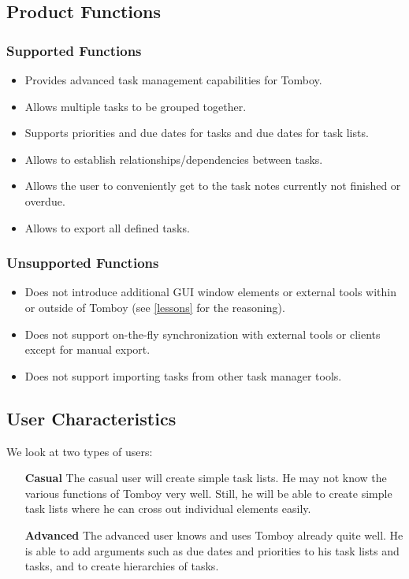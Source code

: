 \subsection{Product Functions}
\label{description:functions}

  \subsubsection*{Supported Functions}
  \label{description:functions:supported}

    \begin{itemize}
      \item Provides advanced task management capabilities for Tomboy.
      \item Allows multiple tasks to be grouped together.
      \item Supports priorities and due dates for tasks and due dates for task lists.
      \item Allows to establish relationships/dependencies between tasks.
      \item Allows the user to conveniently get to the task notes currently not finished or overdue.
      \item Allows to export all defined tasks.
    \end{itemize}

    \subsubsection*{Unsupported Functions}
      \label{description:functions:unsupported}
      \begin{itemize}
        \item Does not introduce additional GUI window elements or external tools within or outside of Tomboy (see \ref{lessons} for the reasoning).
        \item Does not support on-the-fly synchronization with external tools or clients except for manual export.
        \item Does not support importing tasks from other task manager tools.
      \end{itemize}

\subsection{User Characteristics}
\label{description:usercharacteristics}
We look at two types of users:

  \begin{itemize}
    \item[\bf{Casual}] The casual user will create simple task lists. He may not know the various functions of Tomboy very well. Still, he will be able to create simple task lists where he can cross out individual elements easily. 

    \item[\bf{Advanced}] The advanced user knows and uses Tomboy already quite well. He is able to add arguments such as due dates and priorities to his task lists and tasks, and to create hierarchies of tasks. 

  \end{itemize}


